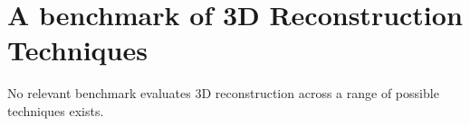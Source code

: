 
\chapter{A benchmark of 3D Reconstruction Techniques}
\label{ch:3DRecon_Benchmark}

No relevant benchmark evaluates 3D reconstruction across a range of possible techniques exists.